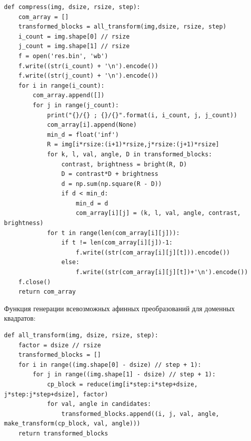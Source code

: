 \documentclass[12pt, fleqn]{article}
\begin{document}
\begin{lstlisting}[label=Код,caption= Код функции compress]
def compress(img, dsize, rsize, step):
    com_array = []
    transformed_blocks = all_transform(img,dsize, rsize, step)
    i_count = img.shape[0] // rsize
    j_count = img.shape[1] // rsize
    f = open('res.bin', 'wb')
    f.write((str(i_count) + '\n').encode())
    f.write((str(j_count) + '\n').encode())
    for i in range(i_count):
        com_array.append([])
        for j in range(j_count):
            print("{}/{} ; {}/{}".format(i, i_count, j, j_count))
            com_array[i].append(None)
            min_d = float('inf')
            R = img[i*rsize:(i+1)*rsize,j*rsize:(j+1)*rsize]
            for k, l, val, angle, D in transformed_blocks:
                contrast, brightness = bright(R, D)
                D = contrast*D + brightness
                d = np.sum(np.square(R - D))
                if d < min_d:
                    min_d = d
                    com_array[i][j] = (k, l, val, angle, contrast, brightness)
            for t in range(len(com_array[i][j])):
                if t != len(com_array[i][j])-1:
                    f.write((str(com_array[i][j][t])).encode())
                else:
                    f.write((str(com_array[i][j][t])+'\n').encode())
    f.close()
    return com_array
\end{lstlisting}
\newpage
Функция генерации всевозможных афинных преобразований для доменных квадратов:
\begin{lstlisting}[label=Код,caption= Функция alltransform]
def all_transform(img, dsize, rsize, step):
    factor = dsize // rsize
    transformed_blocks = []
    for i in range((img.shape[0] - dsize) // step + 1):
        for j in range((img.shape[1] - dsize) // step + 1):
            cp_block = reduce(img[i*step:i*step+dsize, j*step:j*step+dsize], factor)
            for val, angle in candidates:
                transformed_blocks.append((i, j, val, angle, make_transform(cp_block, val, angle)))
    return transformed_blocks
\end{lstlisting}
\end{document}
